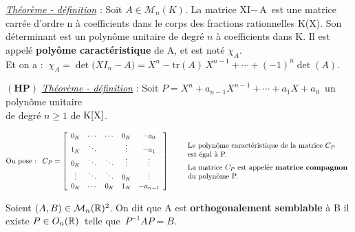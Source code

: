\vspace{0.5cm}

\underline{\emph{Théorème - définition}} : Soit \(A\in \mathcal{M}_n(K)\). La matrice XI$-\,$A\, est une matrice carrée d'ordre n à coefficients dans le corps des fractions rationnelles K(X). Son déterminant est un polynôme unitaire de degré $n$ à coefficients dans K. Il est appelé \textbf{polyôme caractéristique} de A, et est noté $\chi_A$.\vspace{0.1cm}\\
Et on a : \(\ \chi_A=\det\bigl(XI_n-A\bigr)=X^n-\text{tr}(A)\,X^{n-1}+\cdots+(-1)^n\det(A).\)

\vspace{1.7cm}

\(\left(\mathbf{HP}\right)\) \underline{\emph{Théorème - définition}} : Soit \(P=X^n+a_{n-1}X^{n-1}+\cdots+a_1X+a_0\ \) un polynôme unitaire\vspace{0.1cm}\\
de degré $n\geq 1$ de $\text{K}[\text{X}]$.\vspace{-0.3cm}

\[\text{On pose : }\ C_P=\left[
\begin{array}{ccccc}
    0_K & \cdots & \cdots & 0_K & -a_0 \\
    1_K & \ddots & & \vdots & -a_1 \\
    0_K & \ddots & \ddots & \vdots & \vdots \\
    \vdots & \ddots & \ddots & 0_K & \vdots \\
    0_K & \cdots & 0_K & 1_K & -a_{n-1} \\
\end{array}
\right]\qquad
\begin{array}{l}
    \text{Le polynôme caractéristique de la matrice } C_P \\
    \text{est égal à P.}\vspace{0.2cm}\\
    \text{La matrice } C_P \text{ est appelée \textbf{matrice compagnon}\index{matrices!matrice compagnon}}\\
    \text{du polynôme P.}
\end{array} \]

\vspace{1.5cm}

Soient \((A,B)\in \mathcal{M}_n(\mathbb{R})^2\). On dit que A est \textbf{orthogonalement semblable} à B \ssi il existe \(P\in O_n(\mathbb{R})\,\) telle que \(\,P^{-1}AP=B.\)

